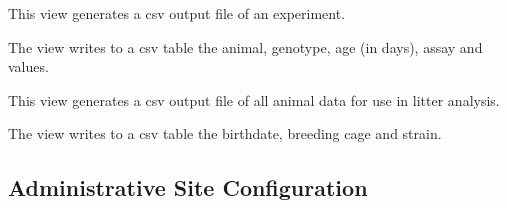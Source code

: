 \documentclass[letterpaper,10pt,english]{sphinxmanual}
\begin{document}
\begin{fulllineitems}
\label{api:mousedb.data.views.experiment_details_csv}
This view generates a csv output file of an experiment.

The view writes to a csv table the animal, genotype, age (in days), assay and values.

\end{fulllineitems}


\begin{fulllineitems}
\label{api:mousedb.data.views.experiment_list}
\end{fulllineitems}


\begin{fulllineitems}
\label{api:mousedb.data.views.litters_csv}
This view generates a csv output file of all animal data for use in litter analysis.

The view writes to a csv table the birthdate, breeding cage and strain.

\end{fulllineitems}


\begin{fulllineitems}
\label{api:mousedb.data.views.study_experiment}
\end{fulllineitems}

\label{api:module-mousedb.data.urls}

\subsection{Administrative Site Configuration}
\label{api:module-mousedb.data.admin}\label{api:administrative-site-configuration}
\end{document}

